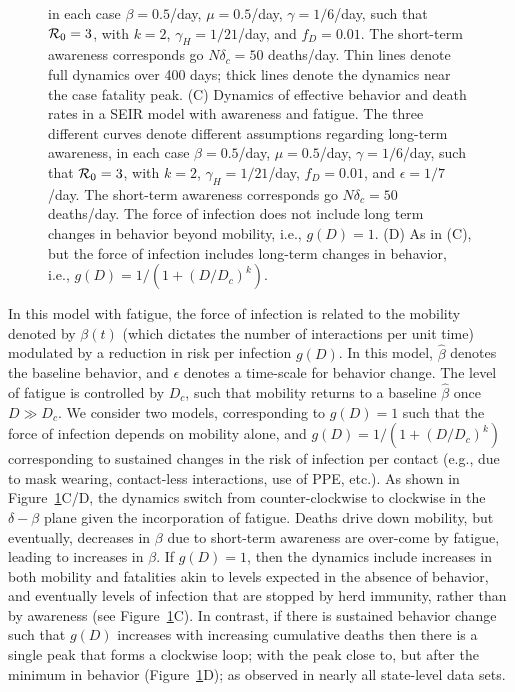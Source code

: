 \begin{figure}
\begin{center}
{in each case $\beta=0.5$/day, $\mu=0.5$/day, $\gamma=1/6$/day, such that ${\cal{R}}_0=3$,
with $k=2$, $\gamma_H=1/21$/day, and $f_D=0.01$.  The short-term awareness
corresponds go $N\delta_c=50$ deaths/day. Thin lines denote
full dynamics over 400 days; thick lines denote the dynamics
near the case fatality peak.
(C) Dynamics of effective behavior and death rates
in a SEIR model with awareness and fatigue. The three
different curves denote different assumptions regarding long-term awareness,
in each case $\beta=0.5$/day, $\mu=0.5$/day, $\gamma=1/6$/day, such that ${\cal{R}}_0=3$,
with $k=2$, $\gamma_H=1/21$/day, $f_D=0.01$, and $\epsilon=1/7$/day.  
The short-term awareness
corresponds go $N\delta_c=50$ deaths/day. 
The force of infection does not include long term changes in behavior
beyond mobility, i.e., $g(D)=1$.
(D) As in (C), but the force
of infection includes long-term changes in behavior, i.e., 
$g(D)=1/\left(1+(D/D_c)^k\right)$.
\label{fig.phase_real_theory}}
\end{center}
\end{figure}


In this model with fatigue,
the force of infection is related to the
mobility denoted by $\beta(t)$ (which dictates
the number of interactions per unit time) modulated by
a reduction in risk per infection $g(D)$.
In this model,
$\hat{\beta}$ denotes the baseline behavior,
and $\epsilon$ denotes a time-scale for behavior change.  
The level of fatigue is controlled by $D_c$, such that
mobility returns to a baseline $\hat{\beta}$ once $D\gg D_c$.
We consider two models, corresponding to
$g(D)=1$ such that the force of infection depends on mobility alone,
and 
$g(D)=1/\left(1+(D/D_c)^k\right)$
corresponding to sustained changes in the risk of infection
per contact (e.g., due to mask wearing, contact-less
interactions, use of PPE, etc.). 
As shown in Figure~\ref{fig.phase_real_theory}C/D, the dynamics 
switch from counter-clockwise to clockwise in the $\delta-\beta$ plane
given the incorporation of fatigue.
Deaths drive down mobility, but eventually,
decreases in $\beta$ due to short-term awareness
are over-come by fatigue, leading to increases in $\beta$.
If $g(D)=1$, then 
the dynamics include increases in both mobility and fatalities
akin to levels expected in the absence of behavior, and eventually
levels of infection that are stopped by herd immunity, rather than by 
awareness (see Figure~\ref{fig.phase_real_theory}C).  
In contrast, if there is sustained behavior change
such that $g(D)$ increases with increasing cumulative deaths
then there is a single peak that forms a clockwise loop; with
the peak close to, but after the minimum in behavior (Figure~\ref{fig.phase_real_theory}D); as observed in nearly all state-level data sets.

